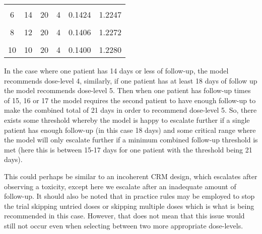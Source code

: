 \begin{table}[H]
\begin{tabular}[t]{cccccc}
		\cellcolor{gray!6}{5} & \cellcolor{gray!6}{15} & \cellcolor{gray!6}{20} & \cellcolor{gray!6}{4} & \cellcolor{gray!6}{0.1437} & \cellcolor{gray!6}{1.2228}\\
		6 & 14 & 20 & 4 & 0.1424 & 1.2247\\
		\cellcolor{gray!6}{7} & \cellcolor{gray!6}{13} & \cellcolor{gray!6}{20} & \cellcolor{gray!6}{4} & \cellcolor{gray!6}{0.1414} & \cellcolor{gray!6}{1.2261}\\
		8 & 12 & 20 & 4 & 0.1406 & 1.2272\\
		\cellcolor{gray!6}{9} & \cellcolor{gray!6}{11} & \cellcolor{gray!6}{20} & \cellcolor{gray!6}{4} & \cellcolor{gray!6}{0.1402} & \cellcolor{gray!6}{1.2278}\\
		10 & 10 & 20 & 4 & 0.1400 & 1.2280\\
		\bottomrule
	\end{tabular}
\end{table}

In the case where one patient has 14 days or less of follow-up, the model recommends dose-level 4, similarly, if one patient has at least 18 days of follow up the model recommends dose-level 5. Then when one patient has follow-up times of 15, 16 or 17 the model requires the second patient to have enough follow-up to make the combined total of 21 days in order to recommend dose-level 5. So, there exists some threshold whereby the model is happy to escalate further if a single patient has enough follow-up (in this case 18 days) and some critical range where the model will only escalate further if a minimum combined follow-up threshold is met (here this is between 15-17 days for one patient with the threshold being 21 days).

This could perhaps be similar to an incoherent CRM design, which escalates after observing a toxicity, except here we escalate after an inadequate amount of follow-up. It should also be noted that in practice rules may be employed to stop the trial skipping untried doses or skipping multiple doses which is what is being recommended in this case. However, that does not mean that this issue would still not occur even when selecting between two more appropriate dose-levels. 

